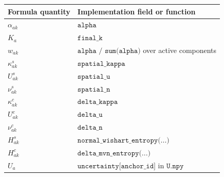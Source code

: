 \documentclass[11pt]{article}
\begin{document}
\begin{center}
\begin{tabular}{ll}
\toprule
Formula quantity & Implementation field or function \\
\midrule
\(\alpha_{ak}\) & \(\texttt{alpha}\) \\
\(K_a\) & \(\texttt{final\_k}\) \\
\(w_{ak}\) & \(\texttt{alpha / sum(alpha)}\) over active components \\
\(\kappa^s_{ak}\) & \(\texttt{spatial\_kappa}\) \\
\(U^s_{ak}\) & \(\texttt{spatial\_u}\) \\
\(\nu^s_{ak}\) & \(\texttt{spatial\_n}\) \\
\(\kappa^c_{ak}\) & \(\texttt{delta\_kappa}\) \\
\(U^c_{ak}\) & \(\texttt{delta\_u}\) \\
\(\nu^c_{ak}\) & \(\texttt{delta\_n}\) \\
\(H^s_{ak}\) & \(\texttt{normal\_wishart\_entropy(...)}\) \\
\(H^c_{ak}\) & \(\texttt{delta\_mvn\_entropy(...)}\) \\
\(U_a\) & \(\texttt{uncertainty[anchor\_id]}\) in \(\texttt{U.npy}\) \\
\bottomrule
\end{tabular}
\end{center}
\end{document}
